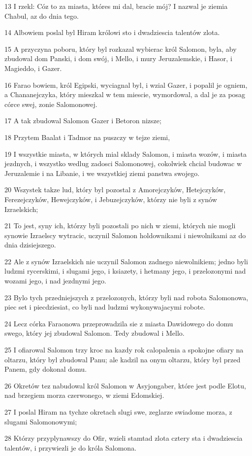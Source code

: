 \par 13 I rzekl: Cóz to za miasta, któres mi dal, bracie mój? I nazwal je ziemia Chabul, az do dnia tego.
\par 14 Albowiem poslal byl Hiram królowi sto i dwadziescia talentów zlota.
\par 15 A przyczyna poboru, który byl rozkazal wybierac król Salomon, byla, aby zbudowal dom Panski, i dom swój, i Mello, i mury Jeruzalemskie, i Hasor, i Magieddo, i Gazer.
\par 16 Farao bowiem, król Egipski, wyciagnal byl, i wzial Gazer, i popalil je ogniem, a Chananejczyka, który mieszkal w tem miescie, wymordowal, a dal je za posag córce swej, zonie Salomonowej.
\par 17 A tak zbudowal Salomon Gazer i Betoron nizsze;
\par 18 Przytem Baalat i Tadmor na puszczy w tejze ziemi,
\par 19 I wszystkie miasta, w których mial sklady Salomon, i miasta wozów, i miasta jezdnych, i wszystko wedlug zadosci Salomonowej, cokolwiek chcial budowac w Jeruzalemie i na Libanie, i we wszystkiej ziemi panstwa swojego.
\par 20 Wszystek takze lud, który byl pozostal z Amorejczyków, Hetejczyków, Ferezejczyków, Hewejczyków, i Jebuzejczyków, którzy nie byli z synów Izraelskich;
\par 21 To jest, syny ich, którzy byli pozostali po nich w ziemi, których nie mogli synowie Izraelscy wytracic, uczynil Salomon holdownikami i niewolnikami az do dnia dzisiejszego.
\par 22 Ale z synów Izraelskich nie uczynil Salomon zadnego niewolnikiem; jedno byli ludzmi rycerskimi, i slugami jego, i ksiazety, i hetmany jego, i przelozonymi nad wozami jego, i nad jezdnymi jego.
\par 23 Bylo tych przedniejszych z przelozonych, którzy byli nad robota Salomonowa, piec set i piecdziesiat, co byli nad ludzmi wykonywajacymi robote.
\par 24 Lecz córka Faraonowa przeprowadzila sie z miasta Dawidowego do domu swego, który jej zbudowal Salomon. Tedy zbudowal i Mello.
\par 25 I ofiarowal Salomon trzy kroc na kazdy rok calopalenia a spokojne ofiary na oltarzu, który byl zbudowal Panu; ale kadzil na onym oltarzu, który byl przed Panem, gdy dokonal domu.
\par 26 Okretów tez nabudowal król Salomon w Asyjongaber, które jest podle Elotu, nad brzegiem morza czerwonego, w ziemi Edomskiej.
\par 27 I poslal Hiram na tychze okretach slugi swe, zeglarze swiadome morza, z slugami Salomonowymi;
\par 28 Którzy przyplynawszy do Ofir, wzieli stamtad zlota cztery sta i dwadziescia talentów, i przywiezli je do króla Salomona.

